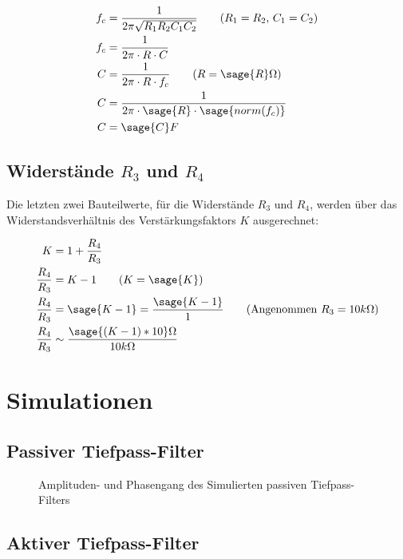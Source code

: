 \documentclass[a4paper]{hitec}
\begin{document}
\begin{align*}
    f_c &= \frac{1}{2\pi \sqrt{R_1 R_2 C_1 C_2}} \tag*{($R_1 = R_2$, $C_1 = C_2$)} \\
    f_c &= \frac{1}{2\pi \cdot R \cdot C} \\
    C &= \frac{1}{2\pi \cdot R \cdot f_c} \tag*{($R = \sage{R}\Omega$)} \\
    C &= \frac{1}{2\pi \cdot \sage{R} \cdot \sage{norm(f_c)}} \\
    C &= \sage{C}F
\end{align*}

\subsection{Widerstände $R_3$ und $R_4$}

Die letzten zwei Bauteilwerte, für die Widerstände $R_3$ und $R_4$, werden über das Widerstandsverhältnis des Verstärkungsfaktors $K$ ausgerechnet:

\begin{align*}
    K &= 1 + \frac{R_4}{R_3} \\
    \frac{R_4}{R_3} &= K - 1 \tag*{($K = \sage{K}$)} \\
    \frac{R_4}{R_3} &= \sage{K-1} = \frac{\sage{K-1}}{1} \tag*{(Angenommen $R_3 = 10k\Omega$)} \\
    \frac{R_4}{R_3} &\sim \frac{\sage{(K-1)*10}\Omega}{10k\Omega}
\end{align*}

\section{Simulationen}

\subsection{Passiver Tiefpass-Filter }

\begin{figure}[H]
    \centering
    
    \caption{Amplituden- und Phasengang des Simulierten passiven Tiefpass-Filters}
\end{figure}

\subsection{Aktiver Tiefpass-Filter }
\end{document}
